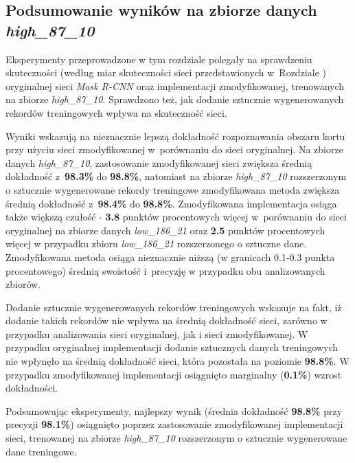 \subsection{Podsumowanie wyników na zbiorze danych \textit{high\_87\_10}}
Eksperymenty przeprowadzone w tym rozdziale polegały na sprawdzeniu skuteczności (według miar skuteczności sieci przedstawionych w~Rozdziale ) oryginalnej sieci \textit{Mask R-CNN} oraz implementacji zmodyfikowanej, trenowanych na zbiorze \textit{high\_87\_10}.
Sprawdzono też, jak dodanie sztucznie wygenerowanych rekordów treningowych wpływa na skuteczność sieci.

Wyniki wskazują na nieznacznie lepszą dokładność rozpoznawania obszaru kortu przy użyciu sieci zmodyfikowanej w~porównaniu do sieci oryginalnej.
Na zbiorze danych \textit{high\_87\_10}, zastosowanie zmodyfikowanej sieci zwiększa średnią dokładność z~\textbf{98.3\%} do \textbf{98.8\%}, natomiast na zbiorze \textit{high\_87\_10} rozszerzonym o sztucznie wygenerowane rekordy treningowe zmodyfikowana metoda zwiększa średnią dokładność z~\textbf{98.4\%} do \textbf{98.8\%}. 
Zmodyfikowana implementacja osiąga także większą czułość - \textbf{3.8} punktów procentowych więcej w~porównaniu do sieci oryginalnej na zbiorze danych \textit{low\_186\_21} oraz \textbf{2.5} punktów procentowych więcej w przypadku zbioru \textit{low\_186\_21} rozszerzonego o sztuczne dane.
Zmodyfikowana metoda osiąga nieznacznie niższą (w granicach 0.1-0.3 punkta procentowego) średnią swoistość i~precyzję w przypadku obu analizowanych zbiorów.


Dodanie sztucznie wygenerowanych rekordów treningowych wskazuje na fakt, iż dodanie takich rekordów nie wpływa na średnią dokładność sieci, zarówno w przypadku analizowania sieci oryginalnej, jak i sieci zmodyfikowanej. W przypadku oryginalnej implementacji dodanie sztucznych danych treningowych nie wpłynęło na średnią dokładność sieci, która pozostała na poziomie \textbf{98.8\%}. W przypadku zmodyfikowanej implementacji osiągnięto marginalny (\textbf{0.1\%}) wzrost dokładności.


Podsumowując eksperymenty, najlepszy wynik (średnia dokładność \textbf{98.8\%} przy precyzji \textbf{98.1\%}) osiągnięto poprzez zastosowanie zmodyfikowanej implementacji sieci, trenowanej na zbiorze \textit{high\_87\_10} rozszerzonym o sztucznie wygenerowane dane treningowe.
